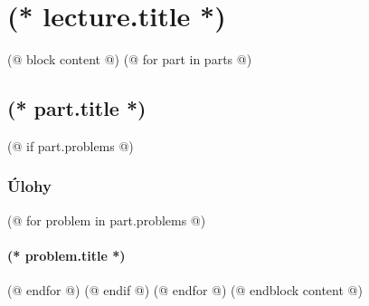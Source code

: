 \documentclass[12pt, twoside]{dgs}
\numberwithin{equation}{subsection}
\numberwithin{figure}{subsection}
\begin{document}
    \pagestyle{scholar}
    \section{(* lecture.title *)}%
    \textit{%
    }

    (@ block content @)
        (@ for part in parts @)
            \subsection{\texorpdfstring{(* part.title *)}{(* part.pdftitle|default(part.title) *)}}
                
                (@ if part.problems @)
                    \subsubsection{Úlohy}
                    (@ for problem in part.problems @)
                        \paragraph{(* problem.title *)}
                        
                    (@ endfor @)
                (@ endif @)
        (@ endfor @)
    (@ endblock content @)
\end{document}
